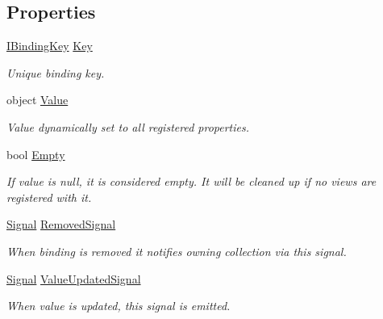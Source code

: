 \subsection*{Properties}
\begin{DoxyCompactItemize}
\item 
\mbox{\hyperlink{interfacecp_games_1_1core_1_1_rapid_m_v_c_1_1_i_binding_key}{I\+Binding\+Key}} \mbox{\hyperlink{interfacecp_games_1_1core_1_1_rapid_m_v_c_1_1_i_binding_aa61ee9cd1b44e221f1ae28f9552792c7}{Key}}
\begin{DoxyCompactList}\small\item\em Unique binding key. \end{DoxyCompactList}\item 
object \mbox{\hyperlink{interfacecp_games_1_1core_1_1_rapid_m_v_c_1_1_i_binding_a7ec4a6dc07e378d9ffd775b4d6b387f7}{Value}}
\begin{DoxyCompactList}\small\item\em Value dynamically set to all registered properties. \end{DoxyCompactList}\item 
bool \mbox{\hyperlink{interfacecp_games_1_1core_1_1_rapid_m_v_c_1_1_i_binding_ad4ea0596cb7a0ef820717785e1e5a4ef}{Empty}}
\begin{DoxyCompactList}\small\item\em If value is null, it is considered empty. It will be cleaned up if no views are registered with it. \end{DoxyCompactList}\item 
\mbox{\hyperlink{classcp_games_1_1core_1_1_rapid_m_v_c_1_1_signal}{Signal}} \mbox{\hyperlink{interfacecp_games_1_1core_1_1_rapid_m_v_c_1_1_i_binding_afc250797ed507d05b9b611f4d63cd345}{Removed\+Signal}}
\begin{DoxyCompactList}\small\item\em When binding is removed it notifies owning collection via this signal. \end{DoxyCompactList}\item 
\mbox{\hyperlink{classcp_games_1_1core_1_1_rapid_m_v_c_1_1_signal}{Signal}} \mbox{\hyperlink{interfacecp_games_1_1core_1_1_rapid_m_v_c_1_1_i_binding_a24032f62e91ba7f08581be9afd09b2c7}{Value\+Updated\+Signal}}
\begin{DoxyCompactList}\small\item\em When value is updated, this signal is emitted. \end{DoxyCompactList}\end{DoxyCompactItemize}


